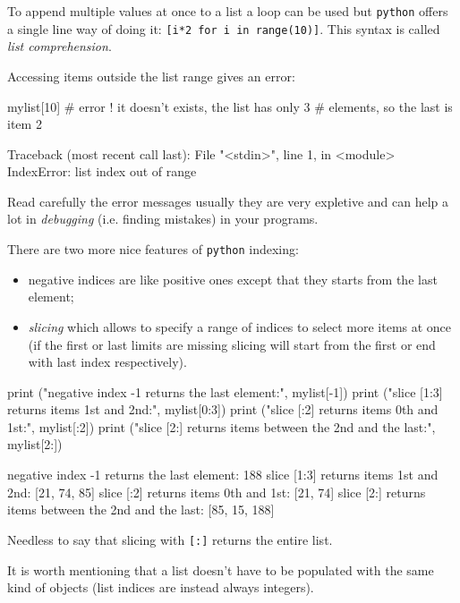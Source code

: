 To append multiple values at once to a list a loop can be used but \texttt{python} offers a single line way of doing it: \texttt{[i*2 for i in range(10)]}. This syntax is called \emph{list comprehension}.

Accessing items outside the list range gives an error:

\begin{ipythonnon}
mylist[10] # error ! it doesn't exists, the list has only 3
           # elements, so the last is item 2
\end{ipythonnon}
\begin{ioutput}
Traceback (most recent call last):
  File "<stdin>", line 1, in <module>
IndexError: list index out of range
\end{ioutput}

Read carefully the error messages usually they are very expletive and can help a lot in \emph{debugging} (i.e. finding mistakes) in your programs.

There are two more nice features of \texttt{python} indexing:

\begin{itemize}
\tightlist
\item negative indices are like positive ones except that they starts from the last element;
\item \emph{slicing} which allows to specify a range of indices to select more items at once (if the first or last limits are missing slicing will start from the first or end with last index respectively).
\end{itemize}

\begin{ipythonnon}
print ("negative index -1 returns the last element:", mylist[-1])
print ("slice [1:3] returns items 1st and 2nd:", mylist[0:3])
print ("slice [:2] returns items 0th and 1st:", mylist[:2])
print ("slice [2:] returns items between the 2nd and the last:", mylist[2:])
\end{ipythonnon}
\begin{ioutput}
negative index -1 returns the last element: 188
slice [1:3] returns items 1st and 2nd: [21, 74, 85]
slice [:2] returns items 0th and 1st: [21, 74]
slice [2:] returns items between the 2nd and the last: [85, 15, 188]
\end{ioutput}
\noindent
Needless to say that slicing with \texttt{[:]} returns the entire list.

It is worth mentioning that a list doesn't have to be populated with the same kind of objects (list indices are instead always integers).

